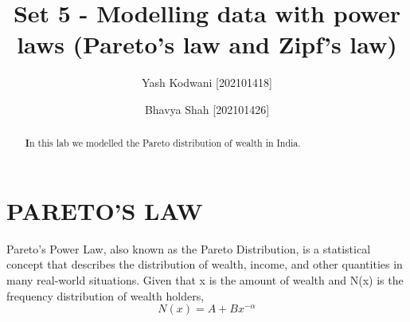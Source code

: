 \documentclass[aps,twocolumn,10pt,reprint]{revtex4}
\newcommand{\be}{\begin{equation}}
\newcommand{\ee}{\end{equation}}
\begin{document}
\title{Set 5 - Modelling data with power laws (Pareto’s law and Zipf’s law)}

\author{Yash Kodwani [202101418]}
\author{Bhavya Shah [202101426]}

\begin{abstract}

\textbf In this lab we modelled the Pareto
distribution of wealth in India.
\end{abstract}



\maketitle


\section{PARETO'S LAW}

Pareto's Power Law, also known as the Pareto Distribution, is a statistical concept that describes the distribution of wealth, income, and other quantities in many real-world situations. Given that x is the amount of wealth and N(x) is the frequency distribution of wealth holders,
\\
\be\label{Eq:Logisticeq}
N(x) = A+Bx^{-\alpha}
\ee
\\
\end{document}
